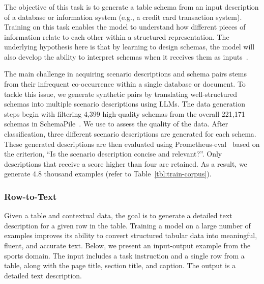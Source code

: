 \subsubsection{\texttotable}
The objective of this task is to generate a table schema from an input description of a database or information system (e.g., a credit card transaction system). Training on this task enables the model to understand how different pieces of information relate to each other within a structured representation. The underlying hypothesis here is that by learning to design schemas, the model will also develop the ability to interpret schemas when it receives them as inputs~\citep{schemamatch}.

The main challenge in acquiring scenario descriptions and schema pairs stems from their infrequent co-occurrence within a single database or document. To tackle this issue, we generate synthetic pairs by translating well-structured schemas into multiple scenario descriptions using LLMs. The data generation steps begin with filtering 4,399 high-quality schemas from the overall 221,171 schemas in SchemaPile~\citep{schemapile}. We use \claudetf to assess the quality of the data. After classification, three different scenario descriptions are generated for each schema. These generated descriptions are then evaluated using Prometheus-eval~\citep{kim2024prometheus} based on the criterion, ``Is the scenario description concise and relevant?''. Only descriptions that receive a score higher than four are retained. As a result, we generate 4.8 thousand examples (refer to Table~\ref{tbl:train-corpus}).



\subsubsection{Row-to-Text} 

Given a table and contextual data, the goal is to generate a detailed text description for a given row in the table. Training a model on a large number of \tabletotext examples improves its ability to convert structured tabular data into meaningful, fluent, and accurate text. Below, we present an input-output example from the sports domain. The input includes a task instruction and a single row from a table, along with the page title, section title, and caption. The output is a detailed text description. 

